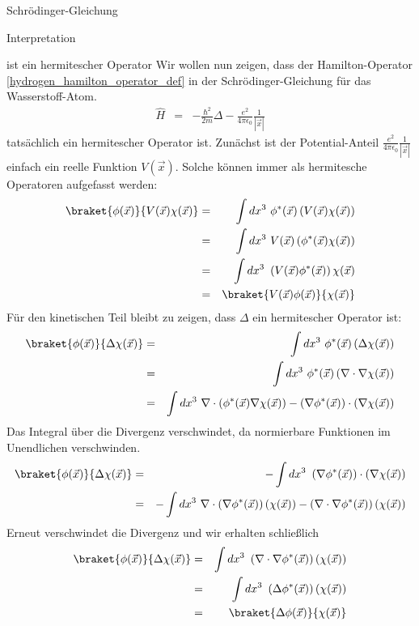 \begin{chapter}{\titlestr}
\begin{section}{Schrödinger-Gleichung}
\begin{subsection}{Interpretation}
\begin{subsubsection}{ ist ein hermitescher Operator}
Wir wollen nun zeigen, dass der Hamilton-Operator \ref{hydrogen_hamilton_operator_def} in der Schrödinger-Gleichung für das Wasserstoff-Atom.
\begin{eqnarray*}
\hat{H}&=&-\frac{\hbar^2}{2m}\Delta-\frac{e^2}{4\pi\epsilon_0}\frac{1}{|\vec{x}|}
\end{eqnarray*}
tatsächlich ein hermitescher Operator ist. Zunächst ist der Potential-Anteil $\frac{e^2}{4\pi\epsilon_0}\frac{1}{|\vec{x}|}$ einfach ein reelle Funktion $V(\vec{x})$. Solche können immer als hermitesche Operatoren aufgefasst werden:
\begin{eqnarray*}
\braket{\phi(\vec{x})}{V(\vec{x})\chi(\vec{x})} &=& \int dx^3\ \phi^*(\vec{x})\left(V(\vec{x})\chi(\vec{x})\right)\\
&=& \int dx^3\ V(\vec{x})\left(\phi^*(\vec{x})\chi(\vec{x})\right)\\
&=& \int dx^3\ \left(V(\vec{x})\phi^*(\vec{x})\right)\chi(\vec{x})\\
&=& \braket{V(\vec{x})\phi(\vec{x})}{\chi(\vec{x})}
\end{eqnarray*}
Für den kinetischen Teil bleibt zu zeigen, dass $\Delta$ ein hermitescher Operator ist:
\begin{eqnarray*}
\braket{\phi(\vec{x})}{\Delta\chi(\vec{x})} &=& \int dx^3\ \phi^*(\vec{x})\left(\Delta\chi(\vec{x})\right)\\
&=& \int dx^3\ \phi^*(\vec{x})\left(\nabla\cdot\nabla\chi(\vec{x})\right)\\
&=& \int dx^3\ \nabla\cdot\left(\phi^*(\vec{x})\nabla\chi(\vec{x})\right)-\left(\nabla\phi^*(\vec{x})\right)\cdot\left(\nabla\chi(\vec{x})\right)
\end{eqnarray*}
Das Integral über die Divergenz verschwindet, da normierbare Funktionen im Unendlichen verschwinden.
\begin{eqnarray*}
\braket{\phi(\vec{x})}{\Delta\chi(\vec{x})} &=& -\int dx^3\ \left(\nabla\phi^*(\vec{x})\right)\cdot\left(\nabla\chi(\vec{x})\right)\\
 &=& -\int dx^3\ \nabla\cdot\left(\nabla\phi^*(\vec{x})\right)\left(\chi(\vec{x})\right)-\left(\nabla\cdot\nabla\phi^*(\vec{x})\right)\left(\chi(\vec{x})\right)
\end{eqnarray*}
Erneut verschwindet die Divergenz und wir erhalten schließlich
\begin{eqnarray*}
\braket{\phi(\vec{x})}{\Delta\chi(\vec{x})} &=& \int dx^3\ \left(\nabla\cdot\nabla\phi^*(\vec{x})\right)\left(\chi(\vec{x})\right)\\
 &=& \int dx^3\ \left(\Delta\phi^*(\vec{x})\right)\left(\chi(\vec{x})\right)\\
&=&\braket{\Delta\phi(\vec{x})}{\chi(\vec{x})}
\end{eqnarray*}
\end{subsubsection}


\end{subsection}
\end{section}
\end{chapter}
